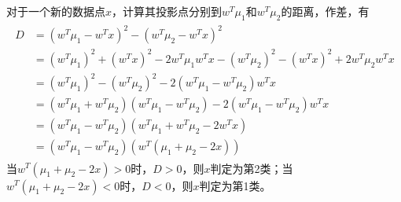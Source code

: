 对于一个新的数据点$x$，计算其投影点分别到$w^T\mu_1$和$w^T\mu_2$的距离，作差，有
\begin{eqnarray}
\begin{aligned}
D&=(w^T\mu_1-w^Tx)^2-(w^T\mu_2-w^Tx)^2\\
&=(w^T\mu_1)^2+(w^Tx)^2-2w^T\mu_1w^Tx-(w^T\mu_2)^2-(w^Tx)^2+2w^T\mu_2w^Tx\\
&=(w^T\mu_1)^2-(w^T\mu_2)^2-2(w^T\mu_1-w^T\mu_2)w^Tx\\
&=(w^T\mu_1+w^T\mu_2)(w^T\mu_1-w^T\mu_2)-2(w^T\mu_1-w^T\mu_2)w^Tx\\
&=(w^T\mu_1-w^T\mu_2)(w^T\mu_1+w^T\mu_2-2w^Tx)\\
&=(w^T\mu_1-w^T\mu_2)(w^T(\mu_1+\mu_2-2x))
\end{aligned}
\end{eqnarray}
当$w^T(\mu_1+\mu_2-2x)>0$时，$D>0$，则$x$判定为第2类；当$w^T(\mu_1+\mu_2-2x)<0$时，$D<0$，则$x$判定为第1类。

